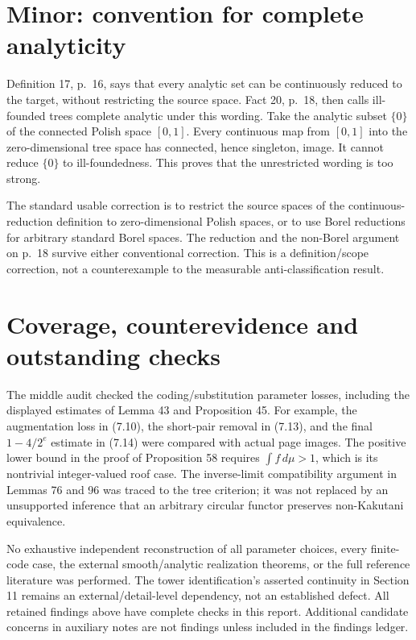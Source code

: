 \documentclass[10pt]{article}
\begin{document}
\section*{Minor: convention for complete analyticity}
Definition 17, p. 16, says that every analytic set can be continuously reduced to the target, without restricting the source space. Fact 20, p. 18, then calls ill-founded trees complete analytic under this wording. Take the analytic subset \(\{0\}\) of the connected Polish space \([0,1]\). Every continuous map from \([0,1]\) into the zero-dimensional tree space has connected, hence singleton, image. It cannot reduce \(\{0\}\) to ill-foundedness. This proves that the unrestricted wording is too strong.\par
The standard usable correction is to restrict the source spaces of the continuous-reduction definition to zero-dimensional Polish spaces, or to use Borel reductions for arbitrary standard Borel spaces. The reduction and the non-Borel argument on p. 18 survive either conventional correction. This is a definition/scope correction, not a counterexample to the measurable anti-classification result.\par
\section*{Coverage, counterevidence and outstanding checks}
The middle audit checked the coding/substitution parameter losses, including the displayed estimates of Lemma 43 and Proposition 45. For example, the augmentation loss in (7.10), the short-pair removal in (7.13), and the final \(1-4/2^e\) estimate in (7.14) were compared with actual page images. The positive lower bound in the proof of Proposition 58 requires \(\int f\,d\mu>1\), which is its nontrivial integer-valued roof case. The inverse-limit compatibility argument in Lemmas 76 and 96 was traced to the tree criterion; it was not replaced by an unsupported inference that an arbitrary circular functor preserves non-Kakutani equivalence.\par
No exhaustive independent reconstruction of all parameter choices, every finite-code case, the external smooth/analytic realization theorems, or the full reference literature was performed. The tower identification’s asserted continuity in Section 11 remains an external/detail-level dependency, not an established defect. All retained findings above have complete checks in this report. Additional candidate concerns in auxiliary notes are not findings unless included in the findings ledger.\par
\end{document}
